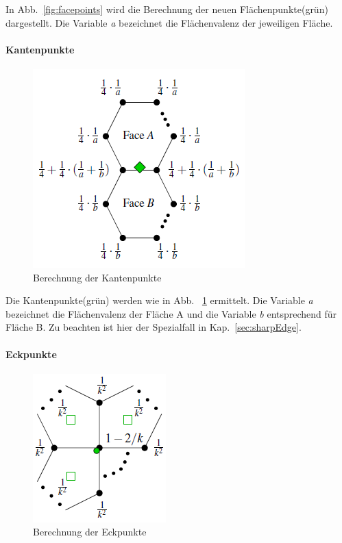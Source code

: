 In Abb.~\ref{fig:facepoints} wird die Berechnung der neuen Flächenpunkte(grün) dargestellt. Die Variable \emph{a} bezeichnet die Flächenvalenz der jeweiligen Fläche.

\paragraph{Kantenpunkte}
\begin{figure}[htpb]
\centering
\includegraphics[scale=0.8]{content/pictures/edgepoints.png}
\caption{Berechnung der Kantenpunkte}
\label{fig:edgepoints}
\end{figure}

Die Kantenpunkte(grün) werden wie in Abb. ~\ref{fig:edgepoints} ermittelt. Die Variable \emph{a} bezeichnet die Flächenvalenz der Fläche A und die Variable \emph{b} entsprechend für Fläche B. Zu beachten ist hier der Spezialfall in Kap.~\ref{sec:sharpEdge}.

\paragraph{Eckpunkte}
\begin{figure}[htpb]
\centering
\includegraphics[scale=0.8]{content/pictures/vertexpoints.png}
\caption{Berechnung der Eckpunkte}
\label{fig:vertexpoints}
\end{figure}

